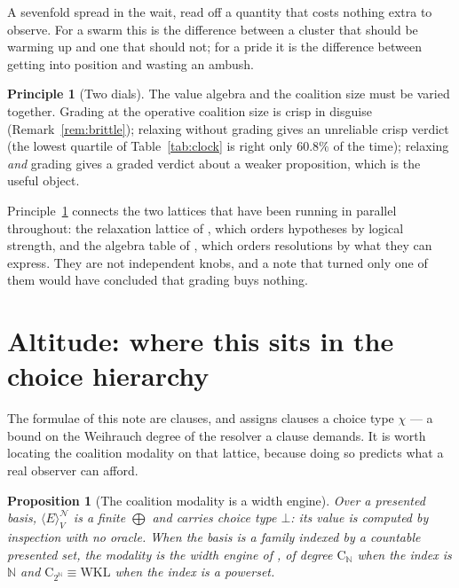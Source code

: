 \documentclass[11pt,a4paper]{article}
\theoremstyle{plain}
\newtheorem{proposition}[theorem]{Proposition}
\theoremstyle{definition}
\newtheorem{principle}[theorem]{Principle}
\theoremstyle{remark}
\newcommand{\gE}[2]{\langle E\rangle^{#1}_{#2}}
\newcommand{\Nsp}{\mathcal{N}}
\newcommand{\Val}{V}
\begin{document}
A sevenfold spread in the wait, read off a quantity that costs nothing extra to
observe. For a swarm this is the difference between a cluster that should be
warming up and one that should not; for a pride it is the difference between
getting into position and wasting an ambush.

\begin{principle}[Two dials]\label{prin:twodials}
The value algebra and the coalition size must be varied together. Grading at
the operative coalition size is crisp in disguise
(Remark~\ref{rem:brittle}); relaxing without grading gives an unreliable crisp
verdict (the lowest quartile of Table~\ref{tab:clock} is right only $60.8\%$ of
the time); relaxing \emph{and} grading gives a graded verdict about a weaker
proposition, which is the useful object.
\end{principle}

Principle~\ref{prin:twodials} connects the two lattices that have been running
in parallel throughout: the relaxation lattice of \cite{scientist}, which orders
hypotheses by logical strength, and the algebra table of
\cite{gradedwhere,choicef}, which orders resolutions by what they can express.
They are not independent knobs, and a note that turned only one of them would
have concluded that grading buys nothing.

\section{Altitude: where this sits in the choice hierarchy}\label{sec:altitude}

The formulae of this note are clauses, and \cite{choicef} assigns clauses a
choice type $\chi$ --- a bound on the Weihrauch degree of the resolver a clause
demands. It is worth locating the coalition modality on that lattice, because
doing so predicts what a real observer can afford.

\begin{proposition}[The coalition modality is a width engine]\label{prop:width}
Over a presented basis, $\gE{\Nsp}{\Val}$ is a finite $\bigoplus$ and carries
choice type $\bot$: its value is computed by inspection with no oracle. When
the basis is a family indexed by a countable presented set, the modality is the
\emph{width} engine of \cite[\S5]{choicef}, of degree $\mathrm{C}_{\mathbb{N}}$
when the index is $\mathbb{N}$ and $\mathrm{C}_{2^{\mathbb{N}}} \equiv
\mathrm{WKL}$ when the index is a powerset.
\end{proposition}
\end{document}
